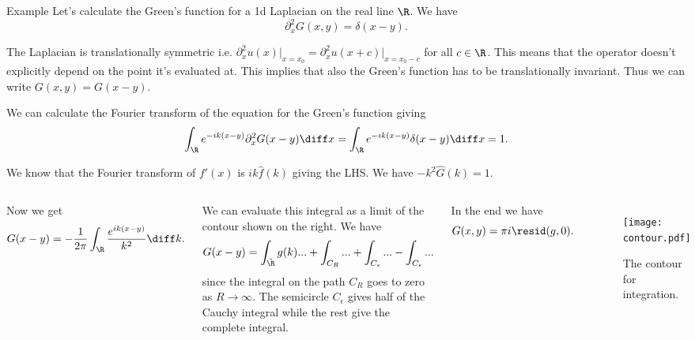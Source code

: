 \begin{frame}{Example}
	Let's calculate the Green's function for a 1d Laplacian on the real line $ \R $. We have
	\[ \partial_x^2 G(x,y) = \delta(x-y). \]
	
	\pause
	The Laplacian is translationally symmetric i.e. $ \partial_x^2 u(x) \Big|_{x=x_0} = \partial_x^2 u(x+c) \Big|_{x=x_0-c}  $ for all $ c \in \R$. This means that the operator doesn't explicitly depend on the point it's evaluated at. This implies that also the Green's function has to be translationally invariant. Thus we can write $ G(x,y) = G(x-y) $.
	
	\pause
	We can calculate the Fourier transform of the equation for the Green's function giving 
	\[ \int_{\R}  e^{-i k (x-y)} \partial_x^2 G(x-y) \diff x = \int_{\R} e^{-i k (x-y)} \delta(x-y) \diff x = 1. \]
	
	\pause
	We know that the Fourier transform of $ f'(x) $ is $ ik\hat{f}(k) $ giving the LHS. We have $ -k^2 \hat{G}(k) = 1 $.
\end{frame}

\begin{frame}
	\begin{columns}[T,onlytextwidth]
		Now we get 
		\[ G(x-y) = -\frac{1}{2\pi} \int_{\R} \frac{e^{ik (x-y)}}{k^2} \diff k. \]
		
		We can evaluate this integral as a limit of the contour shown on the right. We have 
		\[ G(x-y) = \int_{\tilde{\R}}g(k)... + \int_{C_R}... +\int_{C_{\epsilon}}... - \int_{C_{\epsilon}}... \]
		since the integral on the path $ C_R $ goes to zero as $ R \to \infty $. The semicircle $ C_{\epsilon} $ gives half of the Cauchy integral while the rest give the complete integral. 
		
		In the end we have 
		\[ G(x,y) = \pi i \resid(g,0). \]
		
		\vspace{4em}
		\begin{figure}
			\centering
			\texttt{[image: contour.pdf]}
			\caption{The contour for integration.}
		\end{figure}
	\end{columns}
\end{frame}

